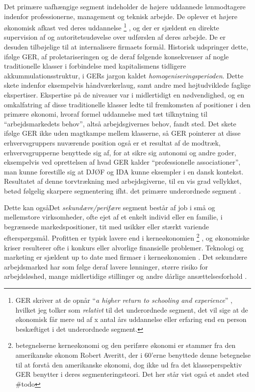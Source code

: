 Det primære uafhængige segment \label{GER kontrol og intern arb marked} indeholder de højere uddannede lønmodtagere indenfor professionerne, management og teknisk arbejde. De oplever et højere økonomisk afkast ved deres uddannelse%
% 
\footnote{GER skriver at de opnår “\emph{a higher return to schooling and experience}” \parencite[202]{Gordon1982}, hvilket jeg tolker som \emph{relativt} til det underordnede segment, det vil sige at de økonomisk får mere ud af x antal års uddannelse eller erfaring end en person beskæftiget i det underordnede segment.}%
%
, og der er sjældent en direkte supervision af og autoritetsudøvelse over udførslen af deres arbejde. De er desuden tilbøjelige til at internalisere firmaets formål. 
Historisk udspringer dette, ifølge GER, af proletariseringen og de deraf følgende konsekvenser af nogle traditionelle klasser i forbindelse med kapitalismens tidligere akkummulationsstruktur, i GERs jargon kaldet \emph{homogeniseringsperioden}.  Dette skete indenfor eksempelvis håndværkerlaug, samt andre med højtudviklede faglige ekspertiser. Ekspertise på de niveauer var i midlertidigt en nødvendighed, og en omkalfatring af disse traditionelle klasser ledte til fremkomsten af positioner i den primære økonomi, hvoraf formel uddannelse med tæt tilknytning til “arbejdsmarkedets behov”, altså arbejdsgivernes behov, fandt sted. Det skete  ifølge GER ikke uden magtkampe mellem klasserne, så GER pointerer at disse erhvervsgruppers nuværende position også er et resultat af de modtræk, erhvervsgrupperne benyttede sig af, for at sikre sig autonomi og andre goder, eksempelvis ved oprettelsen af hvad GER kalder “professionelle associationer”, man kunne forestille sig at DJØF og IDA kunne eksempler i en dansk kontekst. Resultatet af denne torvtrækning med arbejdsgiverne, til en vis grad vellykket, betød følgelig skarpere segmentering ifht. det primære underordnede segment \parencite[202f]{Gordon1982}.

Dette kan ogsåDet \emph{sekundære/perifære} segment består af job i små og mellemstore virksomheder, ofte ejet af et enkelt individ eller en familie, i begrænsede markedspositioner, tit med usikker eller stærkt variende efterspørgsmål. Profitten er typisk lavere end i kerneøkonomien%
%
\footnote{betegnelserne kerneøkonomi og den perifære økonomi er stammer fra den amerikanske økonom Robert Averitt, der i 60'erne benyttede denne betegnelse til at forstå den amerikanske økonomi, dog ikke ud fra det klasseperspektiv GER benytter i deres segmenteringsteori. Det her står vist også et andet sted \#todo}%
%
, og økonomiske kriser resulterer ofte i konkurs eller alvorlige finansielle problemer. Teknologi og marketing er sjældent up to date med firmaer i kerneøkonomien \parencite[7]{Averitt1968}. Det sekundære arbejdsmarked har som følge deraf lavere lønninger, større risiko for arbejdsløshed, mange midlertidige  stillinger og andre dårlige ansættelsesforhold \parencite[70f]{Doeringer1971}.

